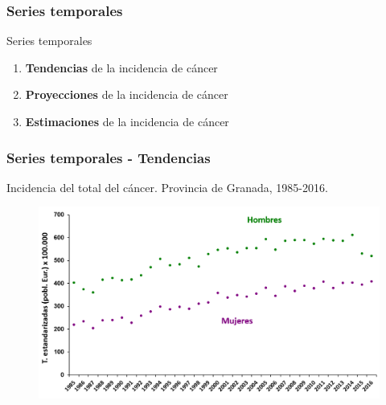 \documentclass{beamer}
\begin{document}
\begin{frame}\frametitle{Series temporales}
	
\begin{block}{Series temporales}
	\begin{enumerate}
		\item \textbf{Tendencias} de la incidencia de cáncer\\[2ex]
		\item \textbf{Proyecciones} de la incidencia de cáncer\\[2ex]
		\item \textbf{Estimaciones} de la incidencia de cáncer\\[2ex]
	\end{enumerate}
\end{block}
	
\end{frame}


\begin{frame}\frametitle{Series temporales - Tendencias}
	
	\centering
	Incidencia del total del cáncer. Provincia de Granada, 1985-2016.
	\begin{figure}
		\centering
		\includegraphics[width=\textwidth]{images/tendencias0.png}
	\end{figure}
	
\end{frame}

\end{document}
